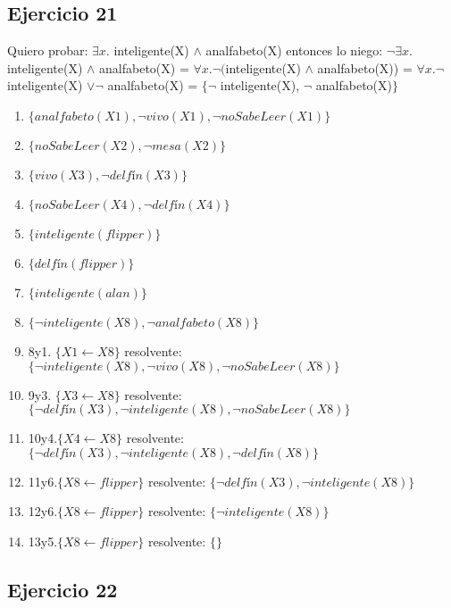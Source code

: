 \documentclass[10pt,a4paper]{article}
\begin{document}
  \subsection{Ejercicio 21}
Quiero probar: $\exists x.$ inteligente(X) $\wedge$ analfabeto(X) entonces lo niego: $\neg \exists x.$ inteligente(X) $\wedge$ analfabeto(X) = $\forall x. \neg ($inteligente(X) $\wedge$ analfabeto(X)) = $\forall x. \neg$ inteligente(X) $\vee \neg$ analfabeto(X) = $\{\neg$ inteligente(X), $\neg$ analfabeto(X)$\}$
\begin{enumerate}
\item $\{analfabeto(X1), \neg vivo(X1), \neg noSabeLeer(X1) \}$
\item $\{noSabeLeer(X2), \neg mesa(X2)\}$
\item $\{vivo(X3), \neg delfín(X3) \}$
\item $\{noSabeLeer(X4), \neg delfín(X4)\}$
\item $\{inteligente(flipper)\}$
\item $\{delfín(flipper)\}$
\item $\{inteligente(alan)\}$
\item $\{\neg inteligente(X8), \neg analfabeto(X8)\}$
\item 8y1. $\{X1 \leftarrow X8 \}$ resolvente: $\{\neg inteligente(X8), \neg vivo(X8), \neg noSabeLeer(X8) \}$
\item 9y3. $\{X3 \leftarrow X8\}$ resolvente: $\{\neg delfín(X3),\neg inteligente(X8), \neg noSabeLeer(X8)\}$
\item 10y4.$\{X4 \leftarrow X8\}$ resolvente: $\{\neg delfín(X3),\neg inteligente(X8), \neg delfín(X8)\}$
\item 11y6.$\{X8 \leftarrow flipper\}$ resolvente: $\{\neg delfín(X3),\neg inteligente(X8)\}$
\item 12y6.$\{X8 \leftarrow flipper\}$ resolvente: $\{\neg inteligente(X8)\}$
\item 13y5.$\{X8 \leftarrow flipper\}$ resolvente: $\{\}$
\end{enumerate}
  \subsection{Ejercicio 22}
\end{document}
